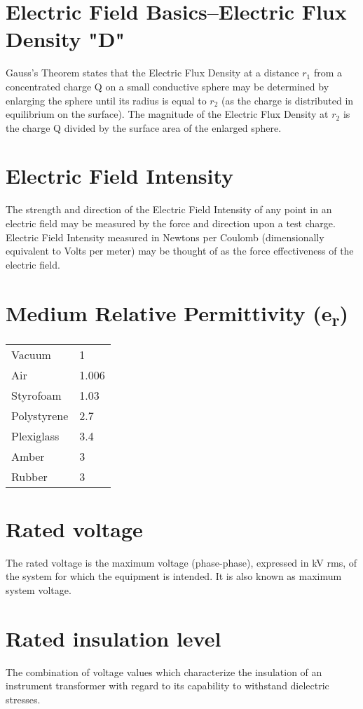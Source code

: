 \section*{Electric Field Basics--Electric Flux Density "D"}
Gauss’s Theorem states that the Electric Flux Density at a distance $r_1$ from a concentrated charge Q on a small conductive sphere may be determined by enlarging the sphere until its radius is equal to $r_2$ (as the charge is distributed in equilibrium on the surface). The magnitude of the Electric Flux Density at $r_2$ is the charge Q divided by the surface area of the enlarged sphere.

\section*{Electric Field Intensity}
The strength and direction of the Electric Field Intensity of any point in an electric field may be measured by the force and direction upon a test charge. Electric Field Intensity measured in Newtons per Coulomb (dimensionally equivalent to Volts per meter) may be thought of as the force effectiveness of the electric field.

\section*{Medium Relative Permittivity (e\textsubscript{r})}
\begin{tabular}{l l}
Vacuum	& 1 \\
Air	& 1.006\\
Styrofoam	& 1.03\\
Polystyrene	& 2.7\\
Plexiglass	& 3.4\\
Amber	& 3\\
Rubber &3 \\
\end{tabular}

\section*{Rated voltage}
The rated voltage is the maximum voltage (phase-phase), expressed in kV rms, of the system for which the equipment is intended. It is also known as maximum system voltage.

\section*{Rated insulation level}
The combination of voltage values which characterize the insulation of an instrument transformer with regard to its capability to withstand dielectric stresses.
